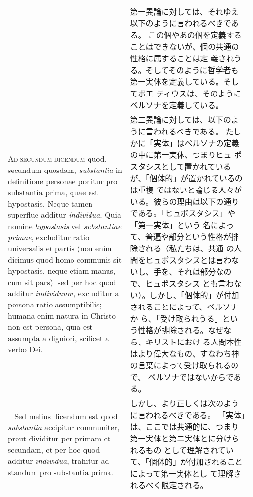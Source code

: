\documentclass[10pt]{jsarticle} %
\begin{document}
\begin{longtable}{p{21em}p{21em}}
&

第一異論に対しては、それゆえ以下のように言われるべきである。
この個やあの個を定義することはできないが、個の共通の性格に属することは定
 義されうる。そしてそのように哲学者も第一実体を定義している。そしてボエ
 ティウスは、そのようにペルソナを定義している。


\\



{\scshape Ad secundum dicendum} quod, secundum quosdam, {\itshape substantia} in definitione
personae ponitur pro substantia prima, quae est hypostasis. Neque tamen
superflue additur {\itshape individua}. Quia nomine {\itshape hypostasis} vel {\itshape substantiae
primae}, excluditur ratio universalis et partis (non enim dicimus quod
homo communis sit hypostasis, neque etiam manus, cum sit pars), sed per
hoc quod additur {\itshape individuum}, excluditur a persona ratio assumptibilis;
humana enim natura in Christo non est persona, quia est assumpta a
digniori, scilicet a verbo Dei. 

&

第二異論に対しては、以下のように言われるべきである。
たしかに「実体」はペルソナの定義の中に第一実体、つまりヒュ
 ポスタシスとして置かれているが、「個体的」が置かれているのは重複
 ではないと論じる人々がいる。彼らの理由は以下の通りである。「ヒュポスタシス」や「第一実体」という
 名によって、普遍や部分という性格が排除される（私たちは、共通
 の人間をヒュポスタシスとは言わないし、手を、それは部分なので、ヒュポスタシス
 とも言わない）。しかし、「個体的」が付加されることによって、ペルソナか
 ら、「受け取られうる」という性格が排除される。なぜなら、キリストにおけ
 る人間本性はより偉大なもの、すなわち神の言葉によって受け取られるので、
 ペルソナではないからである。

\\

-- Sed melius dicendum est quod {\itshape substantia}
accipitur communiter, prout dividitur per primam et secundam, et per hoc
quod additur {\itshape individua}, trahitur ad standum pro substantia prima.

&

しかし、より正しくは次のように言われるべきである。
「実体」は、ここでは共通的に、つまり第一実体と第二実体とに分けられるもの
 として理解されていて、「個体的」が付加されることによって第一実体とし
 て理解されるべく限定される。



\\




\end{longtable}
\end{document}
